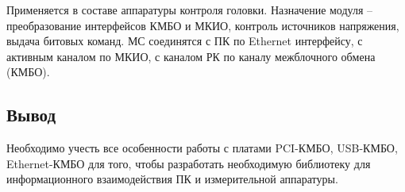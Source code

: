 	Применяется в составе аппаратуры контроля головки. Назначение модуля – преобразование интерфейсов КМБО и МКИО, контроль источников напряжения, выдача битовых команд. МС соединятся с ПК по Ethernet интерфейсу, с активным каналом по МКИО, с каналом РК по каналу межблочного обмена (КМБО). \cite{mc}
	
	\subsection{Вывод}
	Необходимо учесть все особенности работы с платами PCI-КМБО, USB-КМБО, Ethernet-КМБО для того, чтобы разработать необходимую библиотеку для информационного взаимодействия ПК и измерительной аппаратуры.
	
	
		
		
		
		
		

		